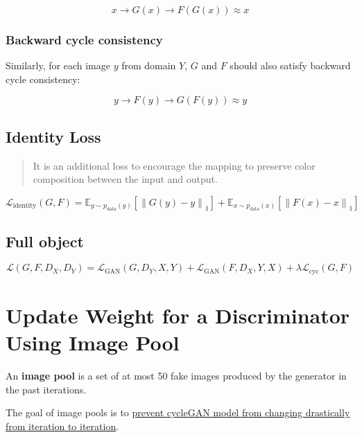 \documentclass[
]{article}
\begin{document}
\[x\rightarrow G(x)\rightarrow F(G(x))\approx x\]

\hypertarget{backward-cycle-consistency}{%
\subsubsection{Backward cycle
consistency}\label{backward-cycle-consistency}}

Similarly, for each image \(y\) from domain \(Y\), \(G\) and \(F\)
should also satisfy backward cycle consistency:

\[y\rightarrow F(y)\rightarrow G(F(y))\approx y\]

\hypertarget{identity-loss-2}{%
\subsection{Identity Loss}\label{identity-loss-2}}

\begin{quote}
It is an additional loss to encourage the mapping to preserve color
composition between the input and output.
\end{quote}

\[\mathcal{L}_{\text{identity}}(G,F)=\mathbb{E}_{y\sim p_{\text{data}}(y)}[\left\|G(y)-y\right\|_1]+\mathbb{E}_{x\sim p_{\text{data}}(x)}[\left\|F(x)-x\right\|_1]\]

\hypertarget{full-object}{%
\subsection{Full object}\label{full-object}}

\[\mathcal{L}(G,F,D_X,D_Y)=\mathcal{L}_{\text{GAN}}(G,D_Y,X,Y)+\mathcal{L}_{\text{GAN}}(F,D_X,Y,X)+\lambda \mathcal{L}_{\text{cyc}}(G,F)\]

\hypertarget{update-weight-for-a-discriminator-using-image-pool}{%
\section{Update Weight for a Discriminator Using Image
Pool}\label{update-weight-for-a-discriminator-using-image-pool}}

An \textbf{image pool} is a set of at most 50 fake images produced by
the generator in the past iterations.

The goal of image pools is to
\href{https://towardsdatascience.com/cyclegan-learning-to-translate-images-without-paired-training-data-5b4e93862c8d}{prevent
cycleGAN model from changing drastically from iteration to iteration}.
\end{document}
